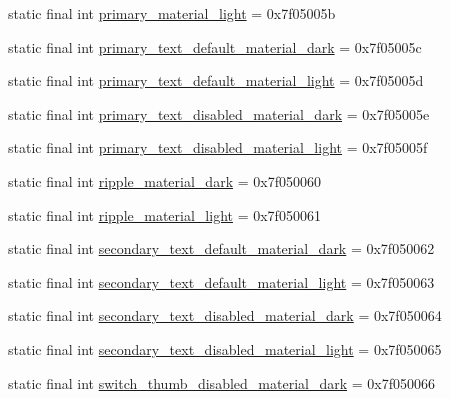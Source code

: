 \begin{DoxyCompactItemize}
static final int \mbox{\hyperlink{classcom_1_1synnapps_1_1carouselview_1_1_r_1_1color_aeda74998fe79238a688d259a494401d3}{primary\+\_\+material\+\_\+light}} = 0x7f05005b
\item 
static final int \mbox{\hyperlink{classcom_1_1synnapps_1_1carouselview_1_1_r_1_1color_a363d309dde170897136a13c3b6894d97}{primary\+\_\+text\+\_\+default\+\_\+material\+\_\+dark}} = 0x7f05005c
\item 
static final int \mbox{\hyperlink{classcom_1_1synnapps_1_1carouselview_1_1_r_1_1color_abb2dd2eaeafb1cba8403cae9275d71d1}{primary\+\_\+text\+\_\+default\+\_\+material\+\_\+light}} = 0x7f05005d
\item 
static final int \mbox{\hyperlink{classcom_1_1synnapps_1_1carouselview_1_1_r_1_1color_a1664ecf82a4518d081727c16b01c523b}{primary\+\_\+text\+\_\+disabled\+\_\+material\+\_\+dark}} = 0x7f05005e
\item 
static final int \mbox{\hyperlink{classcom_1_1synnapps_1_1carouselview_1_1_r_1_1color_a0807ec989319815095f246e1275e99da}{primary\+\_\+text\+\_\+disabled\+\_\+material\+\_\+light}} = 0x7f05005f
\item 
static final int \mbox{\hyperlink{classcom_1_1synnapps_1_1carouselview_1_1_r_1_1color_a7faa32ab7b45e90a4ff9f900a7d94e9d}{ripple\+\_\+material\+\_\+dark}} = 0x7f050060
\item 
static final int \mbox{\hyperlink{classcom_1_1synnapps_1_1carouselview_1_1_r_1_1color_a3dc8d4f87e6e138fba42cad929319d57}{ripple\+\_\+material\+\_\+light}} = 0x7f050061
\item 
static final int \mbox{\hyperlink{classcom_1_1synnapps_1_1carouselview_1_1_r_1_1color_ac8e0e7273709ce120201f049ad967bb4}{secondary\+\_\+text\+\_\+default\+\_\+material\+\_\+dark}} = 0x7f050062
\item 
static final int \mbox{\hyperlink{classcom_1_1synnapps_1_1carouselview_1_1_r_1_1color_abc0d7f67e9fd9beef179b69aa5013ec5}{secondary\+\_\+text\+\_\+default\+\_\+material\+\_\+light}} = 0x7f050063
\item 
static final int \mbox{\hyperlink{classcom_1_1synnapps_1_1carouselview_1_1_r_1_1color_a9e94b8ab7e7e4e85c3b27f33172cc92b}{secondary\+\_\+text\+\_\+disabled\+\_\+material\+\_\+dark}} = 0x7f050064
\item 
static final int \mbox{\hyperlink{classcom_1_1synnapps_1_1carouselview_1_1_r_1_1color_a6106b64ebaf9c3bf61ef1883e1e32c5b}{secondary\+\_\+text\+\_\+disabled\+\_\+material\+\_\+light}} = 0x7f050065
\item 
static final int \mbox{\hyperlink{classcom_1_1synnapps_1_1carouselview_1_1_r_1_1color_a1a28c3669688903dd0798715156ee31f}{switch\+\_\+thumb\+\_\+disabled\+\_\+material\+\_\+dark}} = 0x7f050066

\end{DoxyCompactItemize}
